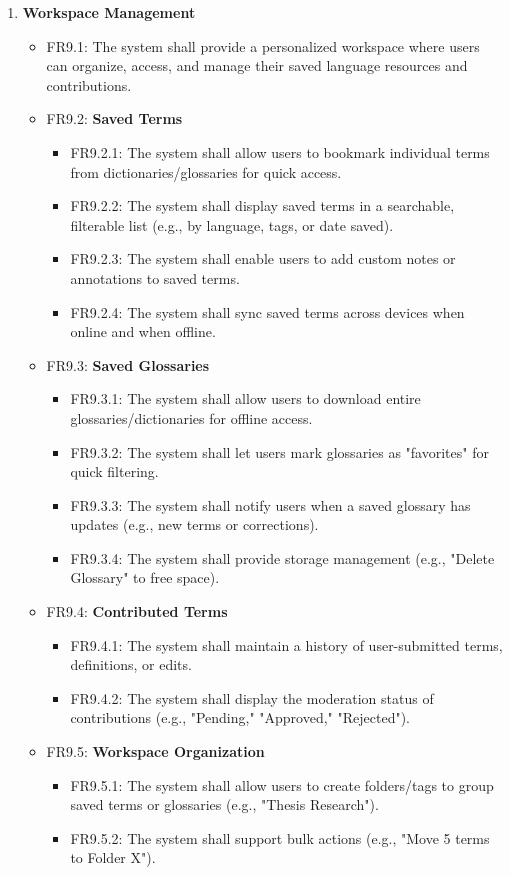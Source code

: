 \documentclass[12pt]{article}
\begin{document}
\begin{enumerate}[label=FR\arabic*:, leftmargin=2.5em]
    \item \textbf{Workspace Management}
    \begin{itemize}
        \item FR9.1: The system shall provide a personalized workspace where users can organize, access, and manage their saved language resources and contributions.
        \item FR9.2: \textbf{Saved Terms}
        \begin{itemize}
            \item FR9.2.1: The system shall allow users to bookmark individual terms from dictionaries/glossaries for quick access.
            \item FR9.2.2: The system shall display saved terms in a searchable, filterable list (e.g., by language, tags, or date saved).
            \item FR9.2.3: The system shall enable users to add custom notes or annotations to saved terms.
            \item FR9.2.4: The system shall sync saved terms across devices when online and when offline.
        \end{itemize}
        \item FR9.3: \textbf{Saved Glossaries}
        \begin{itemize}
            \item FR9.3.1: The system shall allow users to download entire glossaries/dictionaries for offline access.
            \item FR9.3.2: The system shall let users mark glossaries as "favorites" for quick filtering.
            \item FR9.3.3: The system shall notify users when a saved glossary has updates (e.g., new terms or corrections).
            \item FR9.3.4: The system shall provide storage management (e.g., "Delete Glossary" to free space).
        \end{itemize}
        \item FR9.4: \textbf{Contributed Terms}
        \begin{itemize}
            \item FR9.4.1: The system shall maintain a history of user-submitted terms, definitions, or edits.
            \item FR9.4.2: The system shall display the moderation status of contributions (e.g., "Pending," "Approved," "Rejected").
        \end{itemize}
        \item FR9.5: \textbf{Workspace Organization}
        \begin{itemize}
            \item FR9.5.1: The system shall allow users to create folders/tags to group saved terms or glossaries (e.g., "Thesis Research").
            \item FR9.5.2: The system shall support bulk actions (e.g., "Move 5 terms to Folder X").
        \end{itemize}
    \end{itemize}

\end{enumerate}
\end{document}
